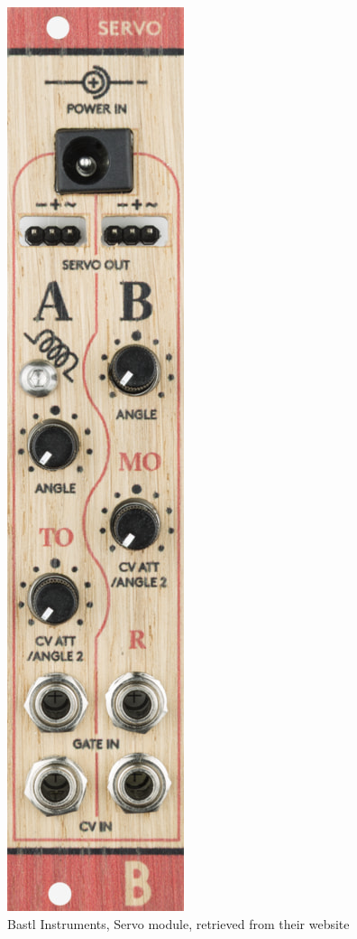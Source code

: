 \begin{figure}[h]
	\centering
	\includegraphics[width=0.75\linewidth,height=0.25\textheight,keepaspectratio]{images/bastl-servo.jpg}
	\caption{Bastl Instruments, Servo module, retrieved from their website}
	\label{fig:bastl-servo}
\end{figure}

